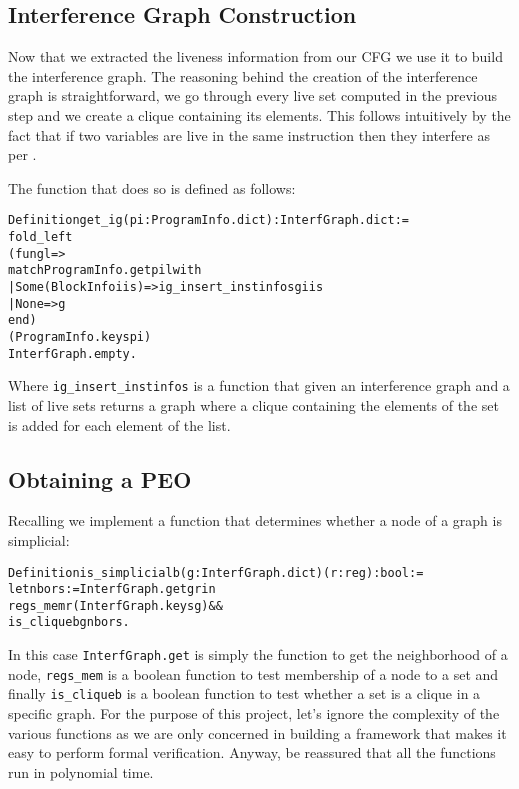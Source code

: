 \subsection{Interference Graph Construction}

Now that we extracted the liveness information from our CFG we use it to build the interference graph.
The reasoning behind the creation of the interference graph is straightforward, we go through every live set computed in the previous step and we create a clique containing its elements. This follows intuitively by the fact that if two variables are live in the same instruction then they interfere as per .

The function that does so is defined as follows:

\begin{alltt}
Definition get_ig (pi : ProgramInfo.dict) : InterfGraph.dict :=
  fold_left
    (fun g l =>
      match ProgramInfo.get pi l with
      | Some (BlockInfo iis) => ig_insert_instinfos g iis
      | None => g
      end)
    (ProgramInfo.keys pi)
    InterfGraph.empty.
\end{alltt}

Where \texttt{ig\_insert\_instinfos} is a function that given an interference graph and a list of live sets returns a graph where a clique containing the elements of the set is added for each element of the list.

\subsection{Obtaining a PEO}

Recalling  we implement a function that determines whether a node of a graph is simplicial:

\begin{alltt}
Definition is_simplicialb (g : InterfGraph.dict) (r : reg) : bool :=
  let nbors := InterfGraph.get g r in
  regs_mem r (InterfGraph.keys g) &&
  is_cliqueb g nbors.
\end{alltt}

In this case \texttt{InterfGraph.get} is simply the function to get the neighborhood of a node, \texttt{regs\_mem} is a boolean function to test membership of a node to a set and finally \texttt{is\_cliqueb} is a boolean function to test whether a set is a clique in a specific graph.
For the purpose of this project, let's ignore the complexity of the various functions as we are only concerned in building a framework that makes it easy to perform formal verification. Anyway, be reassured that all the functions run in polynomial time.


